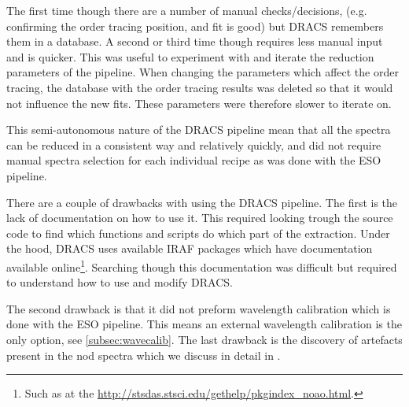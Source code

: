 The first time though there are a number of manual checks/decisions, (e.g. confirming the order tracing position, and fit is good) but DRACS remembers them in a database. A second or third time though requires less manual input and is quicker. This was useful to experiment with and iterate the reduction parameters of the pipeline. When changing the parameters which affect the order tracing, the database with the order tracing results was deleted so that it would not influence the new fits. These parameters were therefore slower to iterate on.

This semi-autonomous nature of the DRACS pipeline mean that all the spectra can be reduced in a consistent way and relatively quickly, and did not require manual spectra selection for each individual recipe as was done with the ESO pipeline.

There are a couple of drawbacks with using the DRACS pipeline. The first is the lack of documentation on how to use it. This required looking trough the source code to find which functions and scripts do which part of the extraction. Under the hood, DRACS uses available IRAF packages which have documentation available online\footnote{Such as at the \href{Space Telescope Science Institute}{http://stsdas.stsci.edu/gethelp/pkgindex\_noao.html}.}. Searching though this documentation was difficult but required to understand how to use and modify DRACS.

The second drawback is that it did not preform wavelength calibration which is done with the ESO pipeline. This means an external wavelength calibration is the only option, see \ref{subsec:wavecalib}. The last drawback is the discovery of artefacts present in the nod spectra which we discuss in detail in
.

